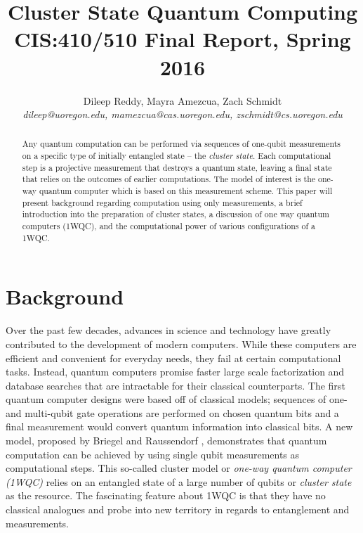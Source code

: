 \documentclass[twocolumn]{Styles/IEEEtran11}
\begin{document}


\title{{\Large \bf Cluster State Quantum Computing}\\ {\normalsize CIS:410/510 Final Report, Spring 2016}}
\author{
Dileep Reddy, Mayra Amezcua, Zach Schmidt \\
{\em dileep@uoregon.edu, mamezcua@cas.uoregon.edu, zschmidt@cs.uoregon.edu }
}
\maketitle

\begin{abstract}
Any quantum computation can be performed via sequences of one-qubit measurements on a specific type of initially entangled state -- the \textit{cluster state}. Each computational step is a projective measurement that destroys a quantum state, leaving a final state that relies on the outcomes of earlier computations. The model of interest is the one-way quantum computer which is based on this measurement scheme. This paper will present background regarding computation using only measurements, a brief introduction into the preparation of cluster states, a discussion of one way quantum computers (1WQC), and the computational power of various configurations of a 1WQC.
\end{abstract}


\section{Background}
Over the past few decades, advances in science and technology have greatly contributed to the development of modern computers. While these computers are efficient and convenient for everyday needs, they fail at certain computational tasks. Instead, quantum computers promise faster large scale factorization and database searches that are intractable for their classical counterparts. The first quantum computer designs were based off of classical models; sequences of one- and multi-qubit gate operations are performed on chosen quantum bits and a final measurement would convert quantum information into classical bits. A new model, proposed by Briegel and Raussendorf \cite{briegel2000measurements}, demonstrates that quantum computation can be achieved by using single qubit measurements as computational steps. This so-called cluster model or \textit{one-way quantum computer (1WQC)} relies on an entangled state of a large number of qubits or \textit{cluster state} as the resource. The fascinating feature about 1WQC is that they have no classical analogues and probe into new territory in regards to entanglement and measurements. 
\end{document}
